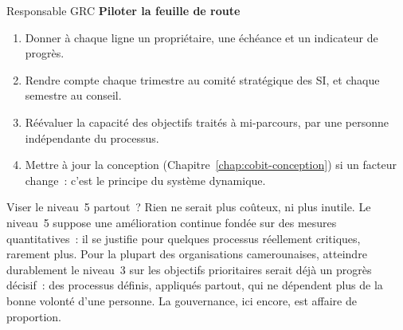 \begin{boxmetier}{Responsable GRC}
\textbf{Piloter la feuille de route}
\begin{enumerate}
    \item Donner à chaque ligne un propriétaire, une échéance et un
          indicateur de progrès.
    \item Rendre compte chaque trimestre au comité stratégique des SI, et
          chaque semestre au conseil.
    \item Réévaluer la capacité des objectifs traités à mi-parcours, par une
          personne indépendante du processus.
    \item Mettre à jour la conception (Chapitre~\ref{chap:cobit-conception})
          si un facteur change~: c'est le principe du système dynamique.
\end{enumerate}
\end{boxmetier}

\begin{boiteRemarque}{Viser le niveau~5 partout~?}
Rien ne serait plus coûteux, ni plus inutile. Le niveau~5 suppose une
amélioration continue fondée sur des mesures quantitatives~: il se
justifie pour quelques processus réellement critiques, rarement plus. Pour
la plupart des organisations camerounaises, atteindre durablement le
niveau~3 sur les objectifs prioritaires serait déjà un progrès décisif~:
des processus définis, appliqués partout, qui ne dépendent plus de la
bonne volonté d'une personne. La gouvernance, ici encore, est affaire de
proportion.
\end{boiteRemarque}

\separateur

